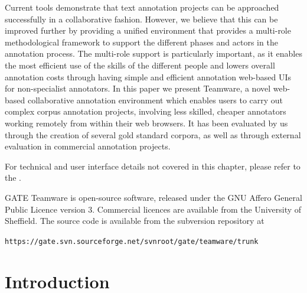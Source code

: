 
\nnormalsize

\def\teamware{Teamware}


Current tools demonstrate that text annotation projects can be approached successfully in a collaborative fashion. However, we believe that this can be improved further by providing a unified environment that provides a multi-role methodological framework to support the different phases and actors in the annotation process. The multi-role support is particularly important, as it enables the most efficient use of the skills of the different people and lowers overall annotation costs through having simple and efficient annotation web-based UIs for non-specialist annotators. In this paper we present \teamware, a novel web-based collaborative annotation 
environment which enables users to carry out complex corpus annotation projects, 
involving less skilled, cheaper annotators working remotely from within their web browsers. 
It has been evaluated by us through the creation of several gold standard corpora, as well as through external evaluation in commercial annotation projects. 

For technical and user interface details not covered in this chapter, please refer to the 
.

GATE Teamware is open-source software, released under the GNU Affero General
Public Licence version 3.  Commercial licences are available from the
University of Sheffield.  The source code is available from the subversion
repository at

{\tt https://gate.svn.sourceforge.net/svnroot/gate/teamware/trunk}

\section{Introduction}

